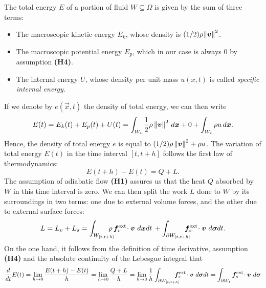 The total energy $E$ of a portion of fluid $W \subseteq \Omega$
is given by the sum of three terms:
\begin{itemize}
\item The macroscopic kinetic energy $E_k$, whose
	density is $(1/2) \rho \!\!\: \left\lVert\bm{v}\right\rVert^2$.
\item The macroscopic potential energy $E_p$, which in our case
	is always 0 by assumption \textbf{(H4)}.
\item The internal energy $U$, whose density per unit mass
	$u(x,t)$ is called \emph{specific internal energy}.
\end{itemize}
If we denote by $e(\vec{x},t)$ the density of total energy,
we can then write
\[
E(t)
= E_k(t) + E_p(t) + U(t)
= \int_{W_t} \frac{1}{2} \rho \left\lVert\bm{v}\right\rVert^2 \, d\bm{x}
+ 0
+ \int_{W_t} \rho u \, d\bm{x}.
\]
Hence, the density of total energy $e$ is equal to
$(1/2) \rho \left\lVert\bm{v}\right\rVert^2 + \rho u$.
The variation of total energy $E(t)$ in the time interval $[t,t+h]$
follows the first law of thermodynamics:
\[
E(t+h) - E(t) = Q + L.
\]
The assumption of adiabatic flow \textbf{(H1)} assures us that
the heat $Q$ absorbed by $W$ in this time interval is zero.
We can then split the work $L$ done to $W$ by its surroundings
in two terms: one due to external volume forces, and the other due to
external surface forces:
\[
L = L_v + L_s
  = \int_{W_{[t,t+h]}} \hspace{-1em}
	\rho \, \vec{f}_v^{\text{ext}} \!\cdot \vec{v} \, \dx \hspace{-1.5pt} \dt \,
  + \int_{\partial W_{[t,t+h]}} \hspace{-1em}
  	\vec{f}_s^{\text{ext}} \!\cdot \vec{v} \, \dsigma \hspace{-2pt} \dt.
\]
On the one hand, it follows from the definition of time derivative,
assumption \textbf{(H4)} and the absolute continuity of the Lebesgue
integral that
\[
\frac{d}{dt} E(t)
	= \lim_{h \to 0} \frac{E(t+h)-E(t)}{h}
	= \lim_{h \to 0} \frac{Q+L}{h}
	= \lim_{h \to 0} \frac{1}{h} \int_{\partial W_{[t,t+h]}} \hspace{-1em}
  		\bm{f}_s^{\text{ext}} \!\cdot \bm{v} \, \, d\bm{\sigma} \hspace{-2pt} \, dt
	= \int_{\partial W_t} \bm{f}_s^{\text{ext}} \!\cdot \bm{v} \, \, d\bm{\sigma}
\]
